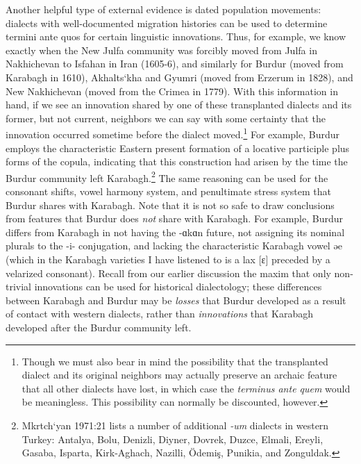 \begin{exe}
Another helpful type of external evidence is dated population movements: dialects with well-documented migration histories can be used to determine termini ante quos for certain linguistic innovations. Thus, for example, we know exactly when the New Julfa community was forcibly moved from Julfa in Nakhichevan to Isfahan in Iran (1605-6), and similarly for Burdur (moved from Karabagh in 1610), Akhalts‘kha  and Gyumri (moved from Erzerum in 1828), and New Nakhichevan (moved from the Crimea in 1779). With this information in hand, if we see an innovation shared by one of these transplanted dialects and its former, but not current, neighbors we can say with some certainty that the innovation occurred sometime before the dialect moved.\footnote{ Though we must also bear in mind the possibility that the transplanted dialect and its original neighbors may actually preserve an archaic feature that all other dialects have lost, in which case the \textit{terminus ante quem} would be meaningless. This possibility can normally be discounted, however.} For example, Burdur employs the characteristic Eastern present formation of a locative participle plus forms of the copula, indicating that this construction had arisen by the time the Burdur community left Karabagh.\footnote{ Mkrtch‘yan 1971:21 lists a number of additional \textit{-um} dialects in western Turkey: Antalya, Bolu, Denizli, Diyner, Dovrek, Duzce, Elmali, Ereyli, Gasaba, Isparta, Kirk-Aghach, Nazilli, Ödemiş, Punikia, and Zonguldak.} The same reasoning can be used for the consonant shifts, vowel harmony system, and penultimate stress system that Burdur shares with Karabagh. Note that it is not so safe to draw conclusions from features that Burdur does \textit{not} share with Karabagh. For example, Burdur differs from Karabagh in not having the -ɑkɑn future, not assigning its nominal plurals to the -i- conjugation, and lacking the characteristic Karabagh vowel ǝe (which in the Karabagh varieties I have listened to is a lax [ɛ] preceded by a velarized consonant). Recall from our earlier discussion the maxim that only non-trivial innovations can be used for historical dialectology; these differences between Karabagh and Burdur may be \textit{losses} that Burdur developed as a result of contact with western dialects, rather than \textit{innovations} that Karabagh developed after the Burdur community left.


\end{exe}
